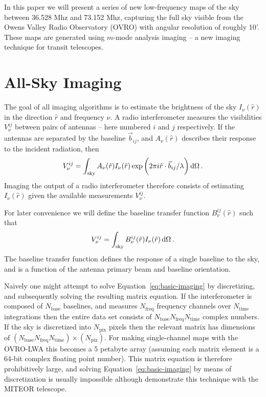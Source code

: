 \documentclass[twocolumn]{aastex61}
\renewcommand{\d}{{\rm d}}
\begin{document}
In this paper we will present a series of new low-frequency maps of the sky between 36.528 Mhz and
73.152 Mhz, capturing the full sky visible from the Owens Valley Radio Observatory (OVRO) with
angular resolution of roughly 10'. These maps are generated using $m$-mode analysis imaging -- a new
imaging technique for transit telescopes.

\section{All-Sky Imaging}

The goal of all imaging algorithms is to estimate the brightness of the sky $I_\nu(\hat r)$ in the
direction $\hat r$ and frequency $\nu$. A radio interferometer measures the visibilities
$V^{ij}_{\nu}$ between pairs of antennas -- here numbered $i$ and $j$ respectively. If the antennas
are separated by the baseline $\vec b_{ij}$, and $A_\nu(\hat r)$ describes their response to the
incident radiation, then
\begin{equation}\label{eq:basic-imaging}
    V^{ij}_\nu = \int_\text{sky}
                 A_\nu(\hat r) I_\nu(\hat r)
                 \exp\bigg(2\pi i \hat r\cdot\vec b_{ij}/\lambda\bigg) \,\d\Omega \, .
\end{equation}
Imaging the output of a radio interferometer therefore consists of estimating $I_\nu(\hat r)$ given
the available measurements $V^{ij}_\nu$.

For later convenience we will define the baseline transfer function $B^{ij}_\nu(\hat r)$ such that
\begin{equation}\label{eq:baseline-transfer-function}
    V^{ij}_\nu = \int_\text{sky} B^{ij}_\nu(\hat r) I_\nu(\hat r) \,\d\Omega \, .
\end{equation}
The baseline transfer function defines the response of a single baseline to the sky, and is a
function of the antenna primary beam and baseline orientation.

Naively one might attempt to solve Equation~\ref{eq:basic-imaging} by discretizing, and subsequently
solving the resulting matrix equation. If the interferometer is composed of $N_\text{base}$
baselines, and measures $N_\text{freq}$ frequency channels over $N_\text{time}$ integrations then
the entire data set consists of $N_\text{base}N_\text{freq}N_\text{time}$ complex numbers. If the
sky is discretized into $N_\text{pix}$ pixels then the relevant matrix has dimensions of
$(N_\text{base}N_\text{freq}N_\text{time})\times(N_\text{pix})$. For making single-channel maps with
the OVRO-LWA this becomes a 5 petabyte array (assuming each matrix element is a 64-bit complex
floating point number).  This matrix equation is therefore prohibitively large, and solving
Equation~\ref{eq:basic-imaging} by means of discretization is usually impossible although
\citet{2017MNRAS.465.2901Z} demonstrate this technique with the MITEOR telescope.
\end{document}
